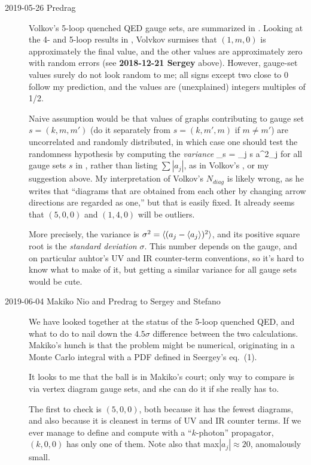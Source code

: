 \begin{description}
\item[2019-05-26 Predrag]
Volkov's
5-loop quenched QED gauge sets, are summarized in .
Looking at the 4- and 5-loop results in , Volvkov surmises
that $(1,m,0)$ is approximately the final value, and the other values are
approximately zero with random errors (see {\bf 2018-12-21 Sergey} above).
However, gauge-set values surely do not look random to me; all signs except two
close to 0 follow my prediction, and the values are (unexplained) integers
multiples of 1/2.

Naive assumption would be that values of graphs contributing to gauge set
$s=(k,m,m')$ (do it separately from $s=(k,m',m)$ if $m\neq m'$) are uncorrelated
and randomly distributed, in which case one should test the randomness hypothesis by
computing the \emph{variance}
\beq
{}_{s} = \sum_{j \in s} a^2_j
for all gauge sets $s$ in , rather than listing $\sum
|a_j|$, as in Volkov's , or my suggestion
 above.
My interpretation of Volkov's $N_{diag}$ is likely wrong, as he writes that
``diagrams that are obtained from each other by changing arrow directions are
regarded as one,'' but that is easily fixed. It already seems that
$(5,0,0)$ and $(1,4,0)$ will be outliers.

More precisely, the {variance} is $\sigma^2=\langle {(a_j-\langle {a_j} \rangle)^2} \rangle$,
and its positive square root is the \emph{standard deviation} $\sigma$.
This number depends on the gauge, and on particular auhtor's UV and IR
counter-term conventions, so it's hard to know what to make of it, but
getting a similar variance for all gauge sets would be cute.

\item[2019-06-04 Makiko Nio and Predrag to Sergey and Stefano] We have
looked together at the status of the 5-loop quenched QED, and what to do
to nail down the $4.5 \sigma$ difference between the two calculations.
Makiko's hunch is that the problem might be numerical, originating in a
Monte Carlo integral with a PDF defined in Seergey's 
eq.~(1).

It looks to me that the ball is in Makiko's court; only way to compare is
via vertex diagram gauge sets, and she can do it if she really has to.

The first to check is $(5,0,0)$, both because it has the fewest diagrams,
and also because it is cleanest in terms of UV and IR counter terms. If
we ever manage to define and compute with a ``$k$-photon'' propagator,
$(k,0,0)$ has only one of them. Note also that max$|a_j|\approx 20$,
anomalously small.


\end{description}
